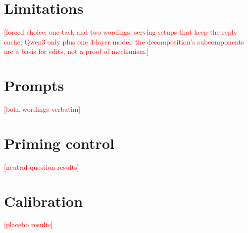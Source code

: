\documentclass[11pt]{article}
\newcommand{\pending}[1]{\textcolor{red}{[#1]}}
\begin{document}
\section{Limitations}
\pending{forced choice; one task and two wordings; serving setups that keep the reply cache; Qwen3 only plus one
4-layer model; the decomposition's subcomponents are a basis for edits, not a proof of mechanism.}

\appendix
\section{Prompts}\label{app:prompts}
\pending{both wordings verbatim}
\section{Priming control}\label{app:neutral}
\pending{neutral question results}
\section{Calibration}\label{app:calibration}
\pending{placebo results}
\end{document}
